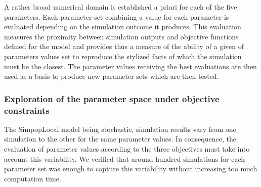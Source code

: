 \documentclass[10pt]{article}
\begin{document}
A rather broad numerical domain is established a priori for each of the five parameters. Each parameter set combining a value for each parameter is evaluated depending on the simulation outcome it produces. This evaluation measures the proximity between simulation outputs and objective functions defined for the model and provides thus a measure of the ability of a given of parameters values set to reproduce the stylized facts of which the simulation must be the closest. The parameter values receiving the best evaluations are then used as a basis to produce new parameter sets which are then tested.


\subsubsection*{Exploration of the parameter space under objective constraints}


The SimpopLocal model being stochastic, simulation results vary from one simulation to the other for the same parameter values. In consequence, the evaluation of parameter values according to the three objectives must take into account this variability. We verified that around hundred simulations for each parameter set was enough to capture this variability without increasing too much computation time.
\end{document}
